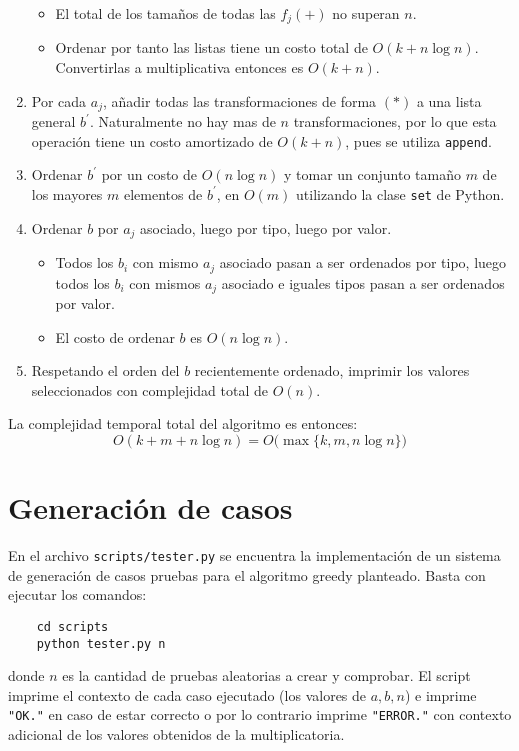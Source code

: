 \documentclass{article}
\theoremstyle{default}
\begin{document}
\begin{enumerate}
		\begin{itemize}
			\item El total de los tamaños de todas las $f_j(+)$ no superan $n$.
			\item Ordenar por tanto las listas tiene un costo total de $O(k + n\log n)$. Convertirlas a multiplicativa entonces es $O(k + n)$.
		\end{itemize}
%
		\item Por cada $a_j$, añadir todas las transformaciones de forma $(*)$ a una lista general $b^\prime$. Naturalmente no hay mas de $n$ transformaciones, por lo que esta operación tiene un costo amortizado de $O(k + n)$, pues se utiliza \texttt{append}.
%
		\item Ordenar $b^\prime$ por un costo de $O(n\log n)$ y tomar un conjunto tamaño $m$ de los mayores $m$ elementos de $b^\prime$, en $O(m)$ utilizando la clase \texttt{set} de Python.
		
		\item Ordenar $b$ por $a_j$ asociado, luego por tipo, luego por valor.
		\begin{itemize}
			\item Todos los $b_i$ con mismo $a_j$ asociado pasan a ser ordenados por tipo, luego todos los $b_i$ con mismos $a_j$ asociado e iguales tipos pasan a ser ordenados por valor.
			\item El costo de ordenar $b$ es $O(n\log n)$.
		\end{itemize}
%
		\item Respetando el orden del $b$ recientemente ordenado, imprimir los valores seleccionados con complejidad total de $O(n)$.
	\end{enumerate}
%
	La complejidad temporal total del algoritmo es entonces:
	\begin{equation*}
		O(k + m + n\log n) = O\big(\max\big\{ k, m, n \log n \big\}\big)
	\end{equation*}
%
%
%
\section{Generación de casos}
En el archivo \texttt{scripts/tester.py} se encuentra la implementación de un sistema de generación de casos pruebas para el algoritmo greedy planteado. Basta con ejecutar los comandos:
\begin{verbatim}
    cd scripts
    python tester.py n
\end{verbatim}
donde $n$ es la cantidad de pruebas aleatorias a crear y comprobar. El script imprime el contexto de cada caso ejecutado (los valores de $a,b,n$) e imprime \texttt{"OK."} en caso de estar correcto o por lo contrario imprime \texttt{"ERROR."} con contexto adicional de los valores obtenidos de la multiplicatoria.
%
\end{document}
